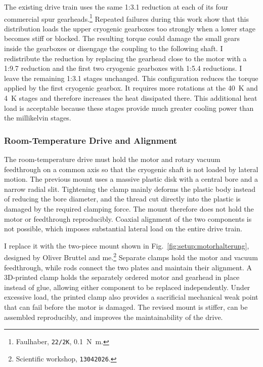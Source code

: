             The existing drive train uses the same 1:3.1 reduction at each of its four commercial spur gearheads.\footnote{Faulhaber, \texttt{22/2K}, \qty{0.1}{\newton\meter}.} Repeated failures during this work show that this distribution loads the upper cryogenic gearboxes too strongly when a lower stage becomes stiff or blocked. The resulting torque could damage the small gears inside the gearboxes or disengage the coupling to the following shaft. I redistribute the reduction by replacing the gearhead close to the motor with a 1:9.7 reduction and the first two cryogenic gearboxes with 1:5.4 reductions. I leave the remaining 1:3.1 stages unchanged. This configuration reduces the torque applied by the first cryogenic gearbox. It requires more rotations at the \qty{40}{\kelvin} and \qty{4}{\kelvin} stages and therefore increases the heat dissipated there. This additional heat load is acceptable because these stages provide much greater cooling power than the millikelvin stages.

        \subsubsection*{Room-Temperature Drive and Alignment}

            The room-temperature drive must hold the motor and rotary vacuum feedthrough on a common axis so that the cryogenic shaft is not loaded by lateral motion. The previous mount uses a massive plastic disk with a central bore and a narrow radial slit. Tightening the clamp mainly deforms the plastic body instead of reducing the bore diameter, and the thread cut directly into the plastic is damaged by the required clamping force. The mount therefore does not hold the motor or feedthrough reproducibly. Coaxial alignment of the two components is not possible, which imposes substantial lateral load on the entire drive train. 
            
            I replace it with the two-piece mount shown in Fig.~\ref{fig:setup:motorhalterung}, designed by Oliver Bruttel and me.\footnote{Scientific workshop, \texttt{13042026}.} Separate clamps hold the motor and vacuum feedthrough, while rods connect the two plates and maintain their alignment. A 3D-printed clamp holds the separately ordered motor and gearhead in place instead of glue, allowing either component to be replaced independently. Under excessive load, the printed clamp also provides a sacrificial mechanical weak point that can fail before the motor is damaged. The revised mount is stiffer, can be assembled reproducibly, and improves the maintainability of the drive.


